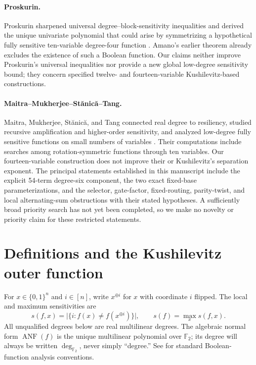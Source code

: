 \documentclass[11pt]{article}
\theoremstyle{definition}
\newcommand{\cube}[1]{\{0,1\}^{#1}}
\newcommand{\Ftwo}{\mathbb F_2}
\newcommand{\ANF}{\operatorname{ANF}}
\begin{document}
\paragraph{Proskurin.}
Proskurin sharpened universal degree--block-sensitivity inequalities and
derived the unique univariate polynomial that could arise by symmetrizing a
hypothetical fully sensitive ten-variable degree-four function
\cite{Proskurin2021}.  Amano's earlier theorem already excludes the existence
of such a Boolean function.  Our claims neither improve Proskurin's universal
inequalities nor provide a new global low-degree sensitivity bound; they
concern specified twelve- and fourteen-variable Kushilevitz-based
constructions.

\paragraph{Maitra--Mukherjee--St\u{a}nic\u{a}--Tang.}
Maitra, Mukherjee, St\u{a}nic\u{a}, and Tang connected real degree to
resiliency, studied recursive amplification and higher-order sensitivity, and
analyzed low-degree fully sensitive functions on small numbers of variables
\cite{MaitraMukherjeeStanicaTang2025}.  Their computations include searches
among rotation-symmetric functions through ten variables.  Our
fourteen-variable construction does not improve their or Kushilevitz's
separation exponent.  The principal statements established in this manuscript
include the explicit 54-term degree-six component, the two exact fixed-base
parameterizations, and the selector, gate-factor, fixed-routing, parity-twist,
and local alternating-sum obstructions with their stated hypotheses.  A
sufficiently broad priority search has not yet been completed, so we make no
novelty or priority claim for these restricted statements.

\section{Definitions and the Kushilevitz outer function}

For \(x\in\cube n\) and \(i\in[n]\), write \(x^{\oplus i}\) for \(x\) with
coordinate \(i\) flipped.  The local and maximum sensitivities are
\[
 s(f,x)=\bigl|\{i:f(x)\ne f(x^{\oplus i})\}\bigr|,
 \qquad s(f)=\max_x s(f,x).
\]
All unqualified degrees below are real multilinear degrees.  The algebraic
normal form \(\ANF(f)\) is the unique multilinear polynomial over \(\Ftwo\);
its degree will always be written \(\deg_{\Ftwo}\), never simply ``degree.''
See \cite{ODonnell2014} for standard Boolean-function analysis conventions.
\end{document}
